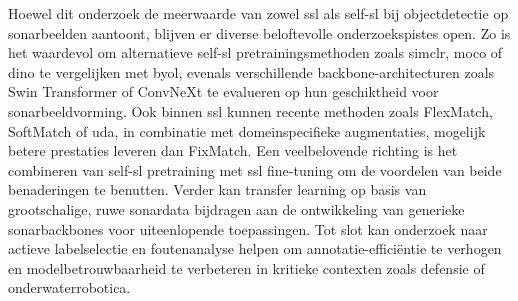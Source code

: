 \documentclass[a0,portrait]{hogent-poster}
\begin{document}
\begin{multicols}{2}
Hoewel dit onderzoek de meerwaarde van zowel \gls{ssl} als \gls{self-sl} bij objectdetectie op sonarbeelden aantoont, blijven er diverse beloftevolle onderzoekspistes open. Zo is het waardevol om alternatieve \gls{self-sl} pretrainingsmethoden zoals \gls{simclr}, \gls{moco} of \gls{dino} te vergelijken met \gls{byol}, evenals verschillende backbone-architecturen zoals Swin Transformer of ConvNeXt te evalueren op hun geschiktheid voor sonarbeeldvorming. Ook binnen \gls{ssl} kunnen recente methoden zoals FlexMatch, SoftMatch of \gls{uda}, in combinatie met domeinspecifieke augmentaties, mogelijk betere prestaties leveren dan FixMatch. Een veelbelovende richting is het combineren van \gls{self-sl} pretraining met \gls{ssl} fine-tuning om de voordelen van beide benaderingen te benutten. Verder kan transfer learning op basis van grootschalige, ruwe sonardata bijdragen aan de ontwikkeling van generieke sonarbackbones voor uiteenlopende toepassingen. Tot slot kan onderzoek naar actieve labelselectie en foutenanalyse helpen om annotatie-efficiëntie te verhogen en modelbetrouwbaarheid te verbeteren in kritieke contexten zoals defensie of onderwaterrobotica.

\end{multicols}
\end{document}
